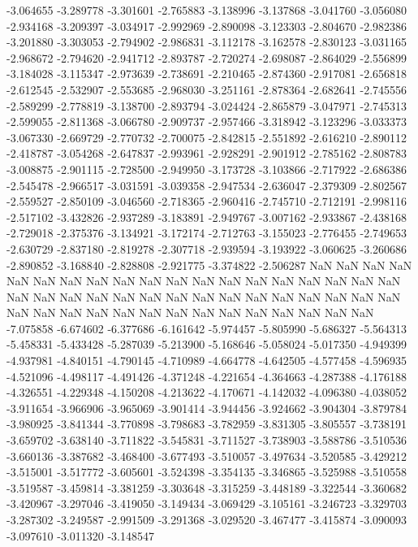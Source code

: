 -3.064655
-3.289778
-3.301601
-2.765883
-3.138996
-3.137868
-3.041760
-3.056080
-2.934168
-3.209397
-3.034917
-2.992969
-2.890098
-3.123303
-2.804670
-2.982386
-3.201880
-3.303053
-2.794902
-2.986831
-3.112178
-3.162578
-2.830123
-3.031165
-2.968672
-2.794620
-2.941712
-2.893787
-2.720274
-2.698087
-2.864029
-2.556899
-3.184028
-3.115347
-2.973639
-2.738691
-2.210465
-2.874360
-2.917081
-2.656818
-2.612545
-2.532907
-2.553685
-2.968030
-3.251161
-2.878364
-2.682641
-2.745556
-2.589299
-2.778819
-3.138700
-2.893794
-3.024424
-2.865879
-3.047971
-2.745313
-2.599055
-2.811368
-3.066780
-2.909737
-2.957466
-3.318942
-3.123296
-3.033373
-3.067330
-2.669729
-2.770732
-2.700075
-2.842815
-2.551892
-2.616210
-2.890112
-2.418787
-3.054268
-2.647837
-2.993961
-2.928291
-2.901912
-2.785162
-2.808783
-3.008875
-2.901115
-2.728500
-2.949950
-3.173728
-3.103866
-2.717922
-2.686386
-2.545478
-2.966517
-3.031591
-3.039358
-2.947534
-2.636047
-2.379309
-2.802567
-2.559527
-2.850109
-3.046560
-2.718365
-2.960416
-2.745710
-2.712191
-2.998116
-2.517102
-3.432826
-2.937289
-3.183891
-2.949767
-3.007162
-2.933867
-2.438168
-2.729018
-2.375376
-3.134921
-3.172174
-2.712763
-3.155023
-2.776455
-2.749653
-2.630729
-2.837180
-2.819278
-2.307718
-2.939594
-3.193922
-3.060625
-3.260686
-2.890852
-3.168840
-2.828808
-2.921775
-3.374822
-2.506287
NaN
NaN
NaN
NaN
NaN
NaN
NaN
NaN
NaN
NaN
NaN
NaN
NaN
NaN
NaN
NaN
NaN
NaN
NaN
NaN
NaN
NaN
NaN
NaN
NaN
NaN
NaN
NaN
NaN
NaN
NaN
NaN
NaN
NaN
NaN
NaN
NaN
NaN
NaN
NaN
NaN
NaN
NaN
NaN
NaN
NaN
NaN
NaN
-7.075858
-6.674602
-6.377686
-6.161642
-5.974457
-5.805990
-5.686327
-5.564313
-5.458331
-5.433428
-5.287039
-5.213900
-5.168646
-5.058024
-5.017350
-4.949399
-4.937981
-4.840151
-4.790145
-4.710989
-4.664778
-4.642505
-4.577458
-4.596935
-4.521096
-4.498117
-4.491426
-4.371248
-4.221654
-4.364663
-4.287388
-4.176188
-4.326551
-4.229348
-4.150208
-4.213622
-4.170671
-4.142032
-4.096380
-4.038052
-3.911654
-3.966906
-3.965069
-3.901414
-3.944456
-3.924662
-3.904304
-3.879784
-3.980925
-3.841344
-3.770898
-3.798683
-3.782959
-3.831305
-3.805557
-3.738191
-3.659702
-3.638140
-3.711822
-3.545831
-3.711527
-3.738903
-3.588786
-3.510536
-3.660136
-3.387682
-3.468400
-3.677493
-3.510057
-3.497634
-3.520585
-3.429212
-3.515001
-3.517772
-3.605601
-3.524398
-3.354135
-3.346865
-3.525988
-3.510558
-3.519587
-3.459814
-3.381259
-3.303648
-3.315259
-3.448189
-3.322544
-3.360682
-3.420967
-3.297046
-3.419050
-3.149434
-3.069429
-3.105161
-3.246723
-3.329703
-3.287302
-3.249587
-2.991509
-3.291368
-3.029520
-3.467477
-3.415874
-3.090093
-3.097610
-3.011320
-3.148547
